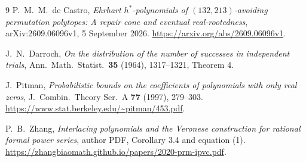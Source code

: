 \documentclass[11pt]{article}
\theoremstyle{remark}\newtheorem{remark}[theorem]{Remark}
\begin{document}
\begin{thebibliography}{9}
P.~M.~M.~de Castro,
\emph{Ehrhart $h^*$-polynomials of $(132,213)$-avoiding permutation
polytopes: A repair cone and eventual real-rootedness},
arXiv:2609.06096v1, 5 September 2026.
\url{https://arxiv.org/abs/2609.06096v1}.

J.~N.~Darroch,
\emph{On the distribution of the number of successes in independent trials},
Ann.\ Math.\ Statist.\ \textbf{35} (1964), 1317--1321, Theorem 4.

J.~Pitman,
\emph{Probabilistic bounds on the coefficients of polynomials with only real zeros},
J.\ Combin.\ Theory Ser.\ A \textbf{77} (1997), 279--303.
\url{https://www.stat.berkeley.edu/~pitman/453.pdf}.

P.~B.~Zhang,
\emph{Interlacing polynomials and the Veronese construction for rational
formal power series}, author PDF, Corollary 3.4 and equation (1).
\url{https://zhangbiaomath.github.io/papers/2020-prm-ipvc.pdf}.
\end{thebibliography}
\end{document}
